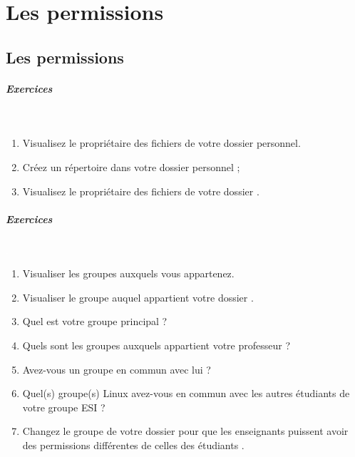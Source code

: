 \documentclass[11pt,a4paper]{article}
\begin{document}
        \section{Les permissions}\subsection{Les permissions}
			
		\subparagraph{Exercices} 
		
					\textcolor{white}{.} \par
				
            \par
        
					\begin{enumerate}
				
			\item Visualisez le propri\'etaire des fichiers de votre dossier personnel.
			\item Cr\'eez un r\'epertoire \verb@tdLinux@ dans votre dossier personnel ;
			\item Visualisez le propri\'etaire des fichiers de votre dossier \verb@tdLinux@.
					
					\end{enumerate}
				
			
		\subparagraph{Exercices} 
		
					\textcolor{white}{.} \par
				
            \par
        
					\begin{enumerate}
				
			\item Visualiser les groupes auxquels vous appartenez.
			\item Visualiser le groupe auquel appartient votre dossier \verb@tdLinux@.
			\item Quel est votre groupe principal ? 
			\item Quels sont les groupes auxquels appartient votre professeur ?
			\item Avez-vous un groupe en commun avec lui ?
			\item Quel(s) groupe(s) Linux avez-vous en commun avec les autres \'etudiants de votre groupe ESI ?
			\item Changez le groupe de  votre dossier \verb@tdLinux@ 
					pour que les enseignants puissent avoir des permissions diff\'erentes de celles des \'etudiants .
					\end{enumerate}
				
\end{document}
